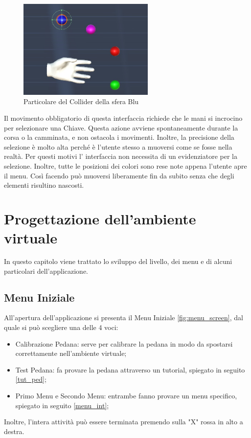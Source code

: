 \documentclass[target=bach,aauheader=]{thud}
\begin{document}
\begin{figure}[h]
    \centering
    \includegraphics[width=0.60\textwidth]{coll}
    \caption{Particolare del Collider della sfera Blu}
    \label{fig:coll}
\end{figure}

\newpage 
Il movimento obbligatorio di questa interfaccia richiede che le mani si incrocino per selezionare una Chiave.
Questa azione avviene spontaneamente durante la corsa o la camminata, e non ostacola i movimenti.
Inoltre, la precisione della selezione è molto alta perché è l'utente stesso a muoversi come se fosse nella realtà.
Per questi motivi l' interfaccia non necessita di un evidenziatore per la selezione.
Inoltre, tutte le posizioni dei colori sono rese note appena l'utente apre il menu.
Così facendo può muoversi liberamente fin da subito senza che degli elementi risultino nascosti. 

\chapter{Progettazione dell'ambiente virtuale} %

In questo capitolo viene trattato lo sviluppo del livello, dei menu e di alcuni particolari dell'applicazione.

\section{Menu Iniziale}
\label{menu_init}
All'apertura dell'applicazione si presenta il Menu Iniziale \ref{fig:menu_screen}, dal quale si può scegliere una delle 4 voci:
\begin{itemize}
    \item Calibrazione Pedana: serve per calibrare la pedana in modo da spostarsi correttamente nell'ambiente virtuale;
    \item Test Pedana: fa provare la pedana attraverso un tutorial, spiegato in seguito \ref{tut_ped};
    \item Primo Menu e Secondo Menu: entrambe fanno provare un menu specifico, spiegato in seguito \ref{menu_int};
\end{itemize} 
Inoltre, l'intera attività può essere terminata premendo sulla "X" rossa in alto a destra.
\end{document}
